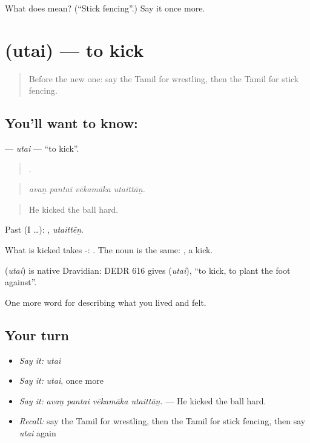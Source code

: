 \begin{tcolorbox}[breakable,colback=teal!4,colframe=teal!35!black,title={Before you move on}]
What does  mean? (\textquotedblleft{}Stick fencing\textquotedblright{}.) Say it once more.
\end{tcolorbox}
\section[\texorpdfstring{\ta{உதை} (utai)}{உதை (utai)}]{ (utai) — to kick}

\label{lesson:TA-C532-utai-kick}



\begin{quote}
Before the new one: say the Tamil for wrestling, then the Tamil for stick fencing.
\end{quote}

\subsection*{You'll want to know: }
\textbf{} — \emph{utai} — \textquotedblleft{}to kick\textquotedblright{}.

\begin{quote}
   .
\end{quote}

\begin{quote}
\emph{avaṉ pantai vēkamāka utaittāṉ.}
\end{quote}

\begin{quote}
He kicked the ball hard.
\end{quote}

Past (I …): , \emph{utaittēṉ}.

What is kicked takes -:  . The noun is the same:  , a kick.

\begin{cousinweb}
\textbf{} (\emph{utai}) is native Dravidian: DEDR 616 gives  (\emph{utai}), \textquotedblleft{}to kick, to plant the foot against\textquotedblright{}.
\end{cousinweb}

\begin{grammarlens}[title={What you've built}]
One more word for describing what you lived and felt.
\end{grammarlens}

\subsection*{Your turn}
\begin{itemize}
\raggedright
  \item \emph{Say it:} \emph{utai}
  \item \emph{Say it:} \emph{utai}, once more
  \item \emph{Say it:} \emph{avaṉ pantai vēkamāka utaittāṉ.} — He kicked the ball hard.
  \item \emph{Recall:} say the Tamil for wrestling, then the Tamil for stick fencing, then say \emph{utai} again
\end{itemize}

